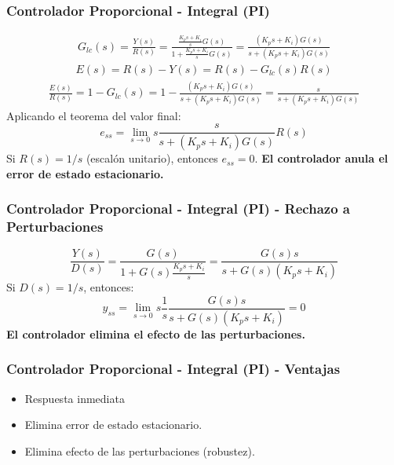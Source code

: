 \documentclass[aspectratio=169,handout]{beamer}
\theoremstyle{definition}
\theoremstyle{plain}
\theoremstyle{remark}
\begin{document}
\begin{frame}[<+->]\frametitle{Controlador Proporcional - Integral (PI)}
\begin{align*}
  G_{lc}(s) = \frac{Y(s)}{R(s)} = \frac{\frac{K_ps + K_i}{s}G(s)}{1 + \frac{K_ps + K_i}{s}G(s)} = \frac{(K_ps + K_i)G(s)}{s + (K_ps+K_i)G(s)}
\end{align*}
\pause
\begin{align*}
  E(s) = R(s) - Y(s) = R(s) - G_{lc}(s)R(s)
\end{align*}
\pause
\begin{align*}
  \frac{E(s)}{R(s)} = 1 - G_{lc}(s) = 1 - \frac{(K_ps + K_i)G(s)}{s + (K_ps+K_i)G(s)} = \frac{s}{s + (K_ps + K_i)G(s)}
\end{align*}
\pause
Aplicando el teorema del valor final:
\begin{equation*}
  e_{ss} = \lim_{s \rightarrow 0} s \frac{s}{s + (K_ps + K_i)G(s)} R(s)
\end{equation*}
\pause
Si $R(s) = 1/s$ (escalón unitario), entonces $e_{ss} = 0$. \textbf{El controlador anula el error de estado estacionario.}
\end{frame}

\begin{frame}[<+->]\frametitle{Controlador Proporcional - Integral (PI) - Rechazo a Perturbaciones}
\begin{equation*}
  \frac{Y(s)}{D(s)} = \frac{G(s)}{1 + G(s)\frac{K_ps + K_i}{s}} = \frac{G(s)s}{s + G(s)(K_ps+K_i)}
\end{equation*}
\pause
Si $D(s) = 1/s$, entonces:
\begin{equation*}
  y_{ss} = \lim_{s \rightarrow 0} s \frac{1}{s} \frac{G(s)s}{s + G(s)(K_ps+K_i)} = 0
\end{equation*}
\pause
\textbf{El controlador elimina el efecto de las perturbaciones.}
\end{frame}

\begin{frame}[<+->]\frametitle{Controlador Proporcional - Integral (PI) - Ventajas}
\begin{itemize}
  \item Respuesta inmediata
  \item Elimina error de estado estacionario.
  \item Elimina efecto de las perturbaciones (robustez).
\end{itemize}
\end{frame}
\end{document}
